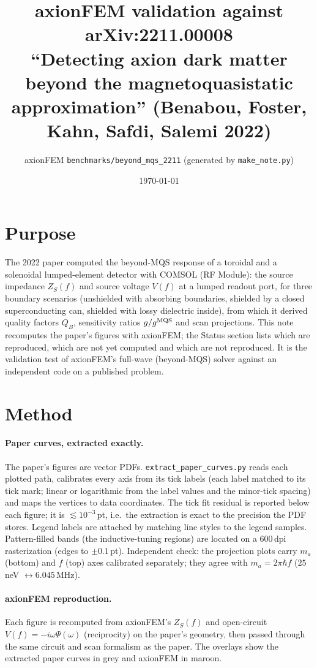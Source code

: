 \documentclass[11pt]{article}
\title{axionFEM validation against arXiv:2211.00008\\[2pt]\large ``Detecting axion dark matter beyond the magnetoquasistatic approximation'' (Benabou, Foster, Kahn, Safdi, Salemi 2022)}
\author{axionFEM \texttt{benchmarks/beyond\_mqs\_2211} (generated by \texttt{make\_note.py})}
\date{\today}
\begin{document}
\maketitle

\section{Purpose}
The 2022 paper computed the beyond-MQS response of a toroidal and a solenoidal lumped-element detector with COMSOL
(RF Module): the source impedance $Z_S(f)$ and source voltage $V(f)$ at a lumped readout port, for three boundary
scenarios (unshielded with absorbing boundaries, shielded by a closed superconducting can, shielded with lossy
dielectric inside), from which it derived quality factors $Q_B$, sensitivity ratios $g/g^{\rm MQS}$ and scan
projections. This note recomputes the paper's figures with axionFEM; the Status section lists which are
reproduced, which are not yet computed and which are not reproduced. It is the validation test of axionFEM's full-wave
(beyond-MQS) solver against an independent code on a published problem.

\section{Method}
\paragraph{Paper curves, extracted exactly.} The paper's figures are vector PDFs. \texttt{extract\_paper\_curves.py}
reads each plotted path, calibrates every axis from its tick labels (each label matched to its tick mark; linear or
logarithmic from the label values and the minor-tick spacing) and maps the vertices to data coordinates. The tick
fit residual is reported below each figure; it is $\lesssim 10^{-3}$\,pt, i.e.\ the extraction is exact to the
precision the PDF stores. Legend labels are attached by matching line styles to the legend samples. Pattern-filled
bands (the inductive-tuning regions) are located on a 600\,dpi rasterization (edges to $\pm0.1$\,pt). Independent
check: the projection plots carry $m_a$ (bottom) and $f$ (top) axes calibrated separately; they agree with
$m_a = 2\pi\hbar f$ ($25$\,neV $\leftrightarrow 6.045$\,MHz).

\paragraph{axionFEM reproduction.} Each figure is recomputed from axionFEM's $Z_S(f)$ and open-circuit
$V(f)=-i\omega\Psi(\omega)$ (reciprocity) on the paper's geometry, then passed through the same circuit and scan
formalism as the paper. The overlays show the extracted paper curves in grey and axionFEM in maroon.
\end{document}
